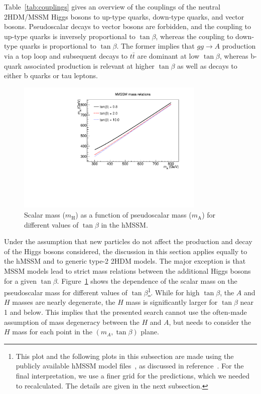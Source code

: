 Table~\ref{tab:couplings} gives an overview of the couplings of the neutral 2HDM/MSSM Higgs bosons to up-type quarks, down-type quarks, and vector bosons. Pseudoscalar decays to vector bosons are forbidden, and the coupling to up-type quarks is inversely proportional to $\tan\beta$, whereas the coupling to down-type quarks is proportional to $\tan\beta$.
The former implies that $gg\rightarrow A$ production via a top loop and subsequent decays to $t\bar t$ are dominant at low $\tan\beta$, whereas b-quark associated production is relevant at higher $\tan\beta$ as well as decays to either b quarks or tau leptons.
\begin{figure}[!Hhtb]
\centering
\includegraphics[width=0.8\textwidth,keepaspectratio=true]{fig/chapt8/hmssm/mh_vs_ma.pdf}
\caption{Scalar mass ($m_\mathrm{H}$) as a function of pseudoscalar mass ($m_\mathrm{A}$) for different values of $\tan\beta$ in the hMSSM.}
\label{fig:hmssm_mass_relations}
\end{figure}

Under the assumption that new particles do not affect the production and decay of the Higgs bosons considered, the discussion in this section applies equally to the hMSSM and to generic type-2 2HDM models.
The major exception is that MSSM models lead to strict mass relations between the additional Higgs bosons for a given $\tan\beta$.
Figure~\ref{fig:hmssm_mass_relations} shows the dependence of the scalar mass on the pseudoscalar mass for different values of $\tan\beta$\footnote{This plot and the following plots in this subsection are made using the publicly available hMSSM model files~\cite{LHCHXSWGMSSM}, as discussed in reference~\cite{deFlorian:2016spz}. For the final interpretation, we use a finer grid for the predictions, which we needed to recalculated. The details are given in the next subsection.}. While for high $\tan\beta$, the $A$ and $H$ masses are nearly degenerate, the $H$ mass is significantly larger for $\tan\beta$ near 1 and below.
This implies that the presented search cannot use the often-made assumption of mass degeneracy between the $H$ and $A$, but needs to consider the $H$ mass for each point in the $(m_A, \tan\beta)$ plane.

